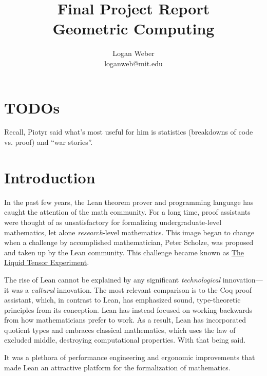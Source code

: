 \documentclass{article}
\begin{document}
\title{%
  Final Project Report
  \\[0.5em]
  \large Geometric Computing \\
}

\author{
Logan Weber\\
loganweb@mit.edu
}

\def\aSigma{\overline{\Sigma}}
\def\asigma{\overline{\sigma}}
\def\aheap{\overline{h}}

\date{}

\maketitle

\section{TODOs}
Recall, Piotyr said what's most useful for him is statistics (breakdowns of code vs. proof) and ``war stories''.

\section{Introduction}
In the past few years, the Lean theorem prover and programming language has caught the attention of the math community.
For a long time, proof assistants were thought of as unsatisfactory for formalizing undergraduate-level mathematics, let alone \textit{research}-level mathematics.
This image began to change when a challenge by accomplished mathematician, Peter Scholze, was proposed and taken up by the Lean community.
This challenge became known as \href{https://xenaproject.wordpress.com/2020/12/05/liquid-tensor-experiment/}{The Liquid Tensor Experiment}.


The rise of Lean cannot be explained by any significant \textit{technological} innovation---it was a \textit{cultural} innovation.
The most relevant comparison is to the Coq proof assistant, which, in contrast to Lean, has emphasized sound, type-theoretic principles from its conception.
Lean has instead focused on working backwards from how mathematicians prefer to work.
As a result, Lean has incorporated quotient types and embraces classical mathematics, which uses the law of excluded middle, destroying computational properties.
With that being said.


It was a plethora of performance engineering and ergonomic improvements that made Lean an attractive platform for the formalization of mathematics.
\end{document}

